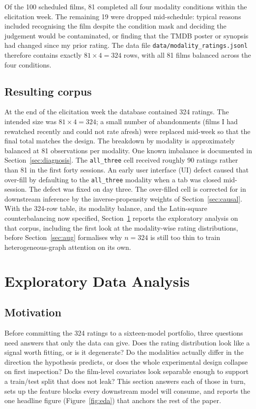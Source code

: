 \documentclass{article}
\begin{document}
Of the 100 scheduled films, 81 completed all four modality conditions within the elicitation week. The remaining 19 were dropped mid-schedule: typical reasons included recognising the film despite the condition mask and deciding the judgement would be contaminated, or finding that the TMDB poster or synopsis had changed since my prior rating. The data file \texttt{data/modality\_ratings.jsonl} therefore contains exactly $81 \times 4 = 324$ rows, with all 81 films balanced across the four conditions.

\subsection{Resulting corpus}

At the end of the elicitation week the database contained 324 ratings. The intended size was $81 \times 4 = 324$; a small number of abandonments (films I had rewatched recently and could not rate afresh) were replaced mid-week so that the final total matches the design. The breakdown by modality is approximately balanced at 81 observations per modality. One known imbalance is documented in Section~\ref{sec:diagnosis}. The \texttt{all\_three} cell received roughly 90 ratings rather than 81 in the first forty sessions. An early user interface (UI) defect caused that over-fill by defaulting to the \texttt{all\_three} modality when a tab was closed mid-session. The defect was fixed on day three. The over-filled cell is corrected for in downstream inference by the inverse-propensity weights of Section~\ref{sec:causal}. With the 324-row table, its modality balance, and the Latin-square counterbalancing now specified, Section~\ref{sec:eda} reports the exploratory analysis on that corpus, including the first look at the modality-wise rating distributions, before Section~\ref{sec:aug} formalises why $n = 324$ is still too thin to train heterogeneous-graph attention on its own.

\section{Exploratory Data Analysis}
\label{sec:eda}

\subsection{Motivation}

Before committing the 324 ratings to a sixteen-model portfolio, three questions need answers that only the data can give. Does the rating distribution look like a signal worth fitting, or is it degenerate? Do the modalities actually differ in the direction the hypothesis predicts, or does the whole experimental design collapse on first inspection? Do the film-level covariates look separable enough to support a train/test split that does not leak? This section answers each of those in turn, sets up the feature blocks every downstream model will consume, and reports the one headline figure (Figure~\ref{fig:eda}) that anchors the rest of the paper.
\end{document}
